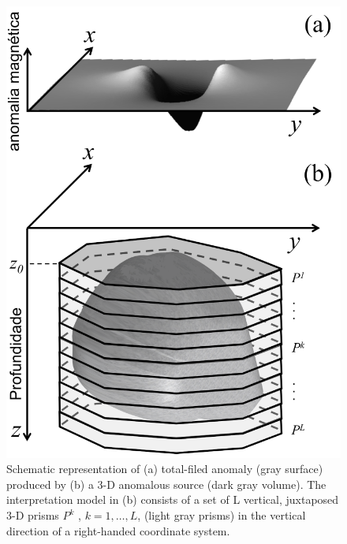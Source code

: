 
\begin{figure}
    \centering
    \includegraphics[scale=0.3]{figures/observed_data.png}
    \caption{Schematic representation of (a) total-filed anomaly (gray surface) produced by (b) a 3-D anomalous source (dark gray volume). The interpretation model in (b) consists of a set of L vertical, juxtaposed 3-D prisms $P^k$ , $k = 1,\dots, L$, (light gray prisms) in the vertical direction of a right-handed coordinate system.}
    \label{fig:obs}
\end{figure}

